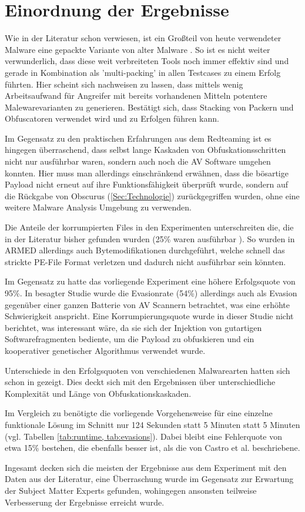 \section{Einordnung der Ergebnisse}
Wie in der Literatur schon verwiesen, ist ein Großteil von heute verwendeter Malware eine gepackte Variante von alter Malware \cite{zhang_2019_a}. So ist es nicht weiter verwunderlich, dass diese weit verbreiteten Tools noch immer effektiv sind und gerade in Kombination als 'multi-packing' in allen Testcases zu einem Erfolg führten. Hier scheint sich nachweisen zu lassen, dass mittels wenig Arbeitsaufwand für Angreifer mit bereits vorhandenen Mitteln potentere Malewarevarianten zu generieren.  Bestätigt sich, dass Stacking von Packern und Obfuscatoren verwendet wird \cite{nawaz_2022_on} und zu Erfolgen führen kann.

Im Gegensatz zu den praktischen Erfahrungen  aus dem Redteaming ist es hingegen überraschend, dass selbst lange Kaskaden von Obfuskationsschritten nicht nur ausführbar waren, sondern auch noch die AV Software umgehen konnten. Hier muss man allerdings einschränkend erwähnen, dass die bösartige Payload nicht erneut auf ihre Funktionsfähigkeit überprüft wurde, sondern auf die Rückgabe von Obscurus (\ref{Sec:Technologie}) zurückgegriffen wurden, ohne eine weitere Malware Analysis Umgebung zu verwenden.

Die Anteile der korrumpierten Files in den Experimenten unterschreiten die, die in der Literatur bisher gefunden wurden (25\% waren ausführbar \cite{castro_2019_armed}). So wurden in ARMED allerdings auch Bytemodifikationen durchgeführt, welche schnell das strickte PE-File Format verletzen und dadurch nicht ausführbar sein könnten. 

Im Gegensatz zu \cite{wang_2022_a} hatte das vorliegende Experiment eine höhere Erfolgsquote von 95\%. In besagter Studie wurde die Evasionrate  (54\%) allerdings auch als Evasion gegenüber einer ganzen Batterie von AV Scannern betrachtet, was eine erhöhte Schwierigkeit anspricht. Eine Korrumpierungsquote wurde in dieser Studie nicht berichtet, was interessant wäre, da sie sich der Injektion von gutartigen Softwarefragmenten bediente, um die Payload zu obfuskieren und ein kooperativer genetischer Algorithmus verwendet wurde.

Unterschiede in den Erfolgsquoten von verschiedenen Malwarearten hatten sich schon in \cite{holm_2023_hide} gezeigt. Dies deckt sich mit den Ergebnissen über unterschiedliche Komplexität und Länge von Obfuskationskaskaden.

Im Vergleich zu \cite{castro_2019_armed} benötigte die vorliegende Vorgehensweise für eine einzelne funktionale Lösung im Schnitt nur 124 Sekunden statt 5 Minuten statt 5 Minuten (vgl. Tabellen \ref{tab:runtime, tab:evasions}). Dabei bleibt eine Fehlerquote von etwa 15\% bestehen, die ebenfalls besser ist, als die von Castro et al. beschriebene.

Ingesamt decken sich die meisten der Ergebnisse aus dem Experiment mit den Daten aus der Literatur, eine Überraschung wurde im Gegensatz zur Erwartung der Subject Matter Experts gefunden, wohingegen ansonsten teilweise Verbesserung der Ergebnisse erreicht wurde.